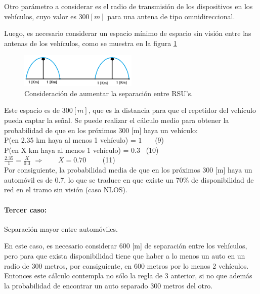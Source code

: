 \documentclass[12pt]{article}
\begin{document}
Otro parámetro a considerar es el radio de transmisión de los dispositivos en los vehículos, cuyo 
valor es $300[m]$ para una antena de tipo omnidireccional.

Luego, es necesario considerar un espacio mínimo de espacio sin visión entre las antenas de los vehículos, 
como se muestra en la figura \ref{fig:adhoc2}
\begin{figure}[H]
  \centering
      \includegraphics[width=0.5\textwidth]{adhoc2}
	    \caption{Consideración de aumentar la separación entre RSU's.}
	\label{fig:adhoc2}
\end{figure}

Este espacio es de $300[m]$, que es la distancia para que el repetidor del vehículo pueda captar la señal. 
Se puede realizar el cálculo medio para obtener la probabilidad de que en los próximos 300 [m] haya un 
vehículo:\\

P(en 2.35 km haya al menos 1 vehículo) = $1$ \qquad \ \ \ \qquad \footnotesize (9) \normalsize\\            

P(en X km haya al menos 1 vehículo) = $0.3$ \qquad \quad \ \qquad \footnotesize (10) \normalsize \\        

\Large $\frac{2.35}{1} = \frac{X}{0.3}$ \normalsize \qquad $\Rightarrow \qquad X = 0.70$
\qquad \ \qquad \ \qquad \ \qquad \ \footnotesize (11) \normalsize\\

Por consiguiente, la probabilidad media de que en los próximos 300 [m] haya un automóvil es de 0.7, 
lo que se traduce en que existe un 70\% de disponibilidad de red en el tramo sin visión (caso NLOS).\\
\paragraph{Tercer caso:} Separación mayor entre automóviles.

En este caso, es necesario considerar 600 [m] de separación entre los vehículos, pero para que exista 
disponibilidad tiene que haber a lo menos un auto en un radio de 300 metros, por consiguiente,
en 600 metros por lo menos 2 vehículos.
Entonces este cálculo contempla no sólo la regla de 3 anterior, si no que además la probabilidad de 
encontrar un auto separado 300 metros del otro.
\end{document}
